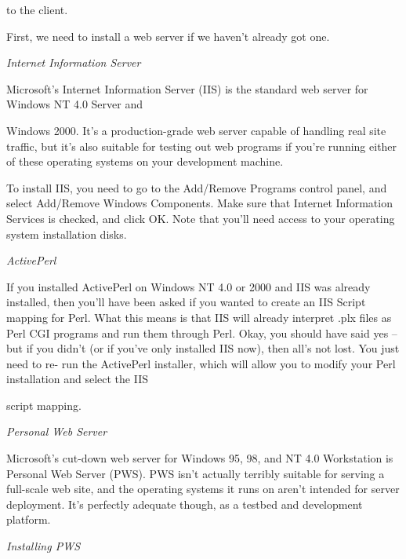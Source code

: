 \documentclass[a4paper,11pt]{book}
\begin{document}
\noindent to the client.

\noindent 

\noindent First, we need to install a web server if we haven't already got one.

\noindent 

\noindent 

\noindent \textit{Internet Information Server}

\noindent Microsoft's Internet Information Server (IIS) is the standard web server for Windows NT 4.0 Server and

\noindent Windows 2000. It's a production-grade web server capable of handling real site traffic, but it's also suitable for testing out web programs if you're running either of these operating systems on your development machine.

\noindent 

\noindent To install IIS, you need to go to the Add/Remove Programs control panel, and select Add/Remove Windows Components. Make sure that Internet Information Services is checked, and click OK. Note that you'll need access to your operating system installation disks.

\noindent 

\noindent \textit{ActivePerl}

\noindent If you installed ActivePerl on Windows NT 4.0 or 2000 and IIS was already installed, then you'll have been asked if you wanted to create an IIS Script mapping for Perl. What this means is that IIS will already interpret .plx files as Perl CGI programs and run them through Perl. Okay, you should have said yes -- but if you didn't (or if you've only installed IIS now), then all's not lost. You just need to re- run the ActivePerl installer, which will allow you to modify your Perl installation and select the IIS

\noindent script mapping.

\noindent 

\noindent \textit{Personal Web Server}

\noindent Microsoft's cut-down web server for Windows 95, 98, and NT 4.0 Workstation is Personal Web Server (PWS). PWS isn't actually terribly suitable for serving a full-scale web site, and the operating systems it runs on aren't intended for server deployment. It's perfectly adequate though, as a testbed and development platform.

\noindent 

\noindent \textit{Installing PWS}
\end{document}
